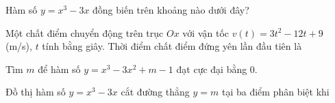 \documentclass{exam}
\begin{document}
\begin{question}
Hàm số $y = x^3 - 3x$ đồng biến trên khoảng nào dưới đây?





\end{question}




\begin{question}
Một chất điểm chuyển động trên trục $Ox$ với vận tốc $v(t) = 3t^2 - 12t + 9$ (m/s), $t$ tính bằng giây. Thời điểm chất điểm đứng yên lần đầu tiên là





\end{question}




\begin{question}
Tìm $m$ để hàm số $y = x^3 - 3x^2 + m - 1$ đạt cực đại bằng $0$.





\end{question}




\begin{question}
Đồ thị hàm số $y = x^3 - 3x$ cắt đường thẳng $y = m$ tại ba điểm phân biệt khi





\end{question}
\end{document}
